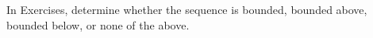 \begin{exerciseset}{In Exercises}{, determine whether the sequence is bounded, bounded above, bounded below, or none of the above.}







\end{exerciseset}

